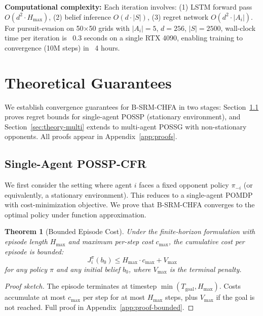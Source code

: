 \documentclass{article}
\newtheorem{theorem}{Theorem}[section]
\begin{document}
\textbf{Computational complexity:} Each iteration involves: (1) LSTM forward pass $O(d^2 \cdot H_{\max})$, (2) belief inference $O(d \cdot |S|)$, (3) regret network $O(d^2 \cdot |A_i|)$. For pursuit-evasion on 50×50 grids with $|A_i|=5$, $d=256$, $|S|=2500$, wall-clock time per iteration is ~0.3 seconds on a single RTX 4090, enabling training to convergence (10M steps) in ~4 hours.

\section{Theoretical Guarantees}

We establish convergence guarantees for B-SRM-CHFA in two stages: Section~\ref{sec:theory-single} proves regret bounds for single-agent POSSP (stationary environment), and Section~\ref{sec:theory-multi} extends to multi-agent POSSG with non-stationary opponents. All proofs appear in Appendix~\ref{app:proofs}.

\subsection{Single-Agent POSSP-CFR}
\label{sec:theory-single}

We first consider the setting where agent $i$ faces a fixed opponent policy $\pi_{-i}$ (or equivalently, a stationary environment). This reduces to a single-agent POMDP with cost-minimization objective. We prove that B-SRM-CHFA converges to the optimal policy under function approximation.

\begin{theorem}[Bounded Episode Cost]
\label{thm:bounded-cost}
Under the finite-horizon formulation with episode length $H_{\max}$ and maximum per-step cost $c_{\max}$, the cumulative cost per episode is bounded:
\begin{equation}
J_i^\pi(b_0) \leq H_{\max} \cdot c_{\max} + V_{\max}
\end{equation}
for any policy $\pi$ and any initial belief $b_0$, where $V_{\max}$ is the terminal penalty.
\end{theorem}

\begin{proof}[Proof sketch]
The episode terminates at timestep $\min(T_{\text{goal}}, H_{\max})$. Costs accumulate at most $c_{\max}$ per step for at most $H_{\max}$ steps, plus $V_{\max}$ if the goal is not reached. Full proof in Appendix~\ref{app:proof-bounded}.
\end{proof}
\end{document}
